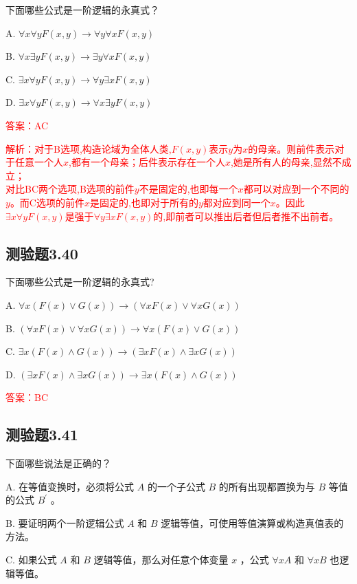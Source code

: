 \documentclass[UTF8, heading=true]{ctexart}
\begin{document}
下面哪些公式是一阶逻辑的永真式？

A. $ \forall x \forall y F(x, y) \rightarrow \forall y \forall x F(x, y)$

B. $\forall x \exists y F(x, y) \rightarrow \exists y \forall x F(x, y)$

C. $\exists x \forall y F(x, y) \rightarrow \forall y \exists x F(x, y)$

D. $ \exists x \forall y F(x, y) \rightarrow \forall x \exists y F(x, y)$

\textcolor{red}{答案：AC}

\textcolor{red}{解析：对于B选项,构造论域为全体人类,$F(x,y)$表示$y$为$x$的母亲。则前件表示对于任意一个人$x$,都有一个母亲；后件表示存在一个人$x$,她是所有人的母亲,显然不成立；
\\ \indent 对比BC两个选项,B选项的前件$y$不是固定的,也即每一个$x$都可以对应到一个不同的$y$。而C选项的前件$x$是固定的,也即对于所有的$y$都对应到同一个$x$。因此$\exists x \forall y F(x, y)$是强于$\forall y \exists x F(x, y)$的,即前者可以推出后者但后者推不出前者。}

\subsection{测验题3.40}

下面哪些公式是一阶逻辑的永真式?

A. $
\forall x(F(x) \vee G(x)) \rightarrow(\forall x F(x) \vee \forall x G(x))
$

B. $
(\forall x F(x) \vee \forall x G(x)) \rightarrow \forall x(F(x) \vee G(x))
$

C. $
\exists x(F(x) \wedge G(x)) \rightarrow(\exists x F(x) \wedge \exists x G(x))
$

D. $
(\exists x F(x) \wedge \exists x G(x)) \rightarrow \exists x(F(x) \wedge G(x))
$

\textcolor{red}{答案：BC}

\subsection{测验题3.41}

下面哪些说法是正确的？

A. 
在等值变换时，必须将公式 $A$ 的一个子公式 $B$ 的所有出现都置换为与 $B$ 等值的公式 $B^{\prime}$ 。

B. 
要证明两个一阶逻辑公式 $A$ 和 $B$ 逻辑等值，可使用等值演算或构造真值表的方法。

C. 
如果公式 $A$ 和 $B$ 逻辑等值，那么对任意个体变量 $x$ ，公式 $\forall x A$ 和 $\forall x B$ 也逻辑等值。
\end{document}

